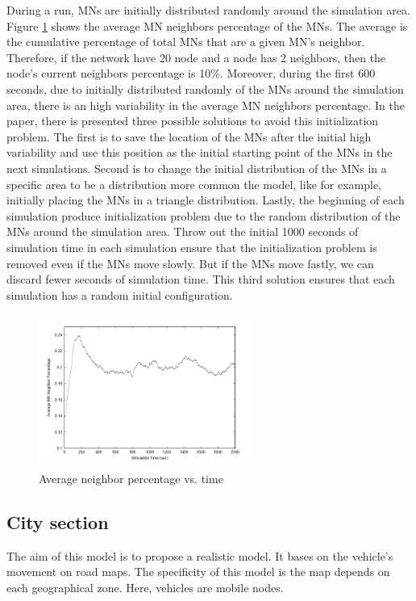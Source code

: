 During a run, MNs are initially distributed randomly around the simulation area. Figure \ref{RandomWaypointFig2} shows the average MN neighbors percentage of the MNs. The average is the cumulative percentage of total MNs that are a given MN's neighbor. Therefore, if the network have 20 node and a node has 2 neighbors, then the node's current neighbors percentage is 10\%. Moreover, during the first 600 seconds, due to initially distributed randomly of the MNs around the simulation area, there is an high variability in the average MN neighbors percentage.
In the paper, there is presented three possible solutions to avoid this initialization problem. The first is to save the location of the MNs after the initial high variability and use this position as the initial starting point of the MNs in the next simulations. Second is to change the initial distribution of the MNs in a specific area to be a distribution more common the model, like for example, initially placing the MNs in a triangle distribution. Lastly, the beginning of each simulation produce initialization problem due to the random distribution of the MNs around the simulation area. Throw out the initial 1000 seconds of simulation time in each simulation ensure that the initialization problem is removed even if the MNs move slowly. But if the MNs move fastly, we can discard fewer seconds of simulation time. This third solution ensures that each simulation has a random initial configuration.

\begin{figure}[h]
\center
\includegraphics[width=7cm,height=50mm]{../images/randomwaypoint2.png}
\caption{\label{RandomWaypointFig2}Average neighbor percentage vs. time}
\end{figure}


\subsection{City section}

The aim of this model is to propose a realistic model. It bases on the vehicle's movement on road maps. The specificity of this model is the map depends on each geographical zone. Here, vehicles are mobile nodes.\\\\

